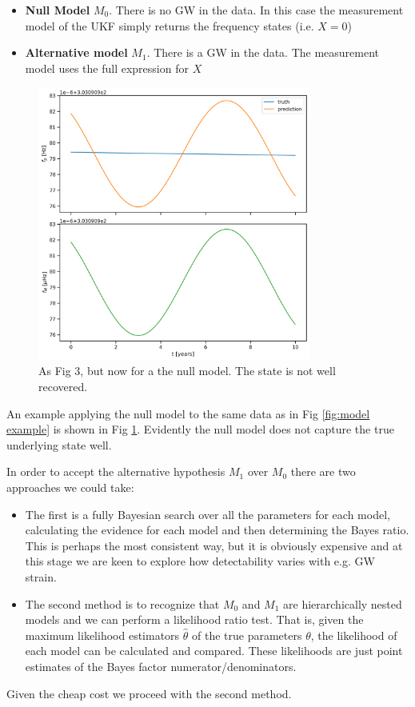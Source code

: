 \documentclass{tufte-handout} %
\begin{document}
\begin{itemize}
	\item \textbf{Null Model} $M_0$. There is no GW in the data. In this case the measurement model of the UKF simply returns the frequency states (i.e. $X= 0$)
	\item \textbf{Alternative model} $M_1$. There is a GW in the data. The measurement model uses the full expression for $X$
\end{itemize}
\begin{figure}
	\includegraphics[width=0.8\textwidth]{images/null}
	\caption{As Fig 3, but now for a the null model. The state is not well recovered.}
	\label{fig:null example}
\end{figure}
\noindent An example applying the null model to the same data as in Fig \ref{fig:model example} is shown in Fig \ref{fig:null example}. Evidently the null model does not capture the true underlying state well. \newline 

\noindent In order to accept the alternative hypothesis $M_1$ over $M_0$ there are two approaches we could take:
\begin{itemize}
	\item The first is a fully Bayesian search over all the parameters for each model, calculating the evidence for each model and then determining the Bayes ratio. This is perhaps the most consistent way, but it is obviously expensive and at this stage we are keen to explore how detectability varies with e.g. GW strain.
	\item The second method is to recognize that $M_0$ and $M_1$ are hierarchically nested models and we can perform a likelihood ratio test. That is, given the maximum likelihood estimators $\hat{\theta}$ of the true parameters $\theta$, the likelihood of each model can be calculated and compared. These likelihoods are just  point estimates of the Bayes factor numerator/denominators.
\end{itemize}
Given the cheap cost we proceed with the second method.
\end{document}
